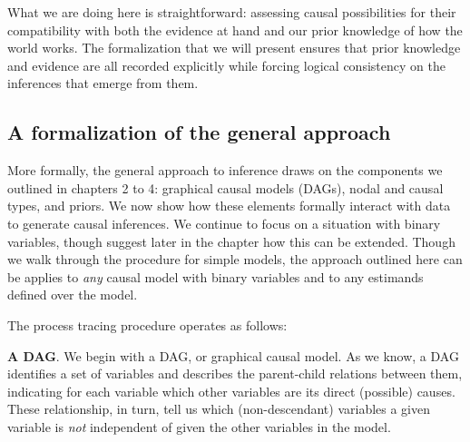 \documentclass[12pt,]{book}
\begin{document}
What we are doing here is straightforward: assessing causal possibilities for their compatibility with both the evidence at hand and our prior knowledge of how the world works. The formalization that we will present ensures that prior knowledge and evidence are all recorded explicitly while forcing logical consistency on the inferences that emerge from them.

\hypertarget{a-formalization-of-the-general-approach}{%
\subsection{A formalization of the general approach}\label{a-formalization-of-the-general-approach}}

More formally, the general approach to inference draws on the components we outlined in chapters 2 to 4: graphical causal models (DAGs), nodal and causal types, and priors. We now show how these elements formally interact with data to generate causal inferences. We continue to focus on a situation with binary variables, though suggest later in the chapter how this can be extended. Though we walk through the procedure for simple models, the approach outlined here can be applies to \emph{any} causal model with binary variables and to any estimands defined over the model.

The process tracing procedure operates as follows:

\textbf{A DAG}. We begin with a DAG, or graphical causal model. As we know, a DAG identifies a set of variables and describes the parent-child relations between them, indicating for each variable which other variables are its direct (possible) causes. These relationship, in turn, tell us which (non-descendant) variables a given variable is \emph{not} independent of given the other variables in the model.
\end{document}
